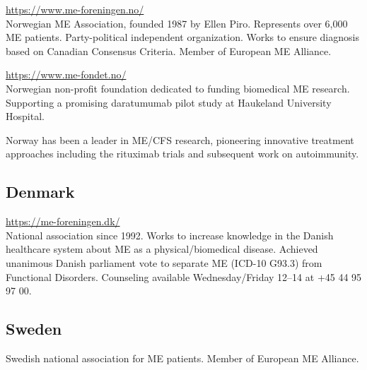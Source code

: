 \begin{description}[style=nextline]
\item[Norges ME Forening] \hfill \url{https://www.me-foreningen.no/}\\
Norwegian ME Association, founded 1987 by Ellen Piro. Represents over 6,000 ME patients. Party-political independent organization. Works to ensure diagnosis based on Canadian Consensus Criteria. Member of European ME Alliance.

\item[ME-Fondet] \hfill \url{https://www.me-fondet.no/}\\
Norwegian non-profit foundation dedicated to funding biomedical ME research. Supporting a promising daratumumab pilot study at Haukeland University Hospital.
\end{description}

\begin{remark}
Norway has been a leader in ME/CFS research, pioneering innovative treatment approaches including the rituximab trials and subsequent work on autoimmunity.
\end{remark}

\subsection{Denmark}
\label{subsec:denmark-orgs}

\begin{description}[style=nextline]
\item[ME Foreningen (Danish ME Association)] \hfill \url{https://me-foreningen.dk/}\\
National association since 1992. Works to increase knowledge in the Danish healthcare system about ME as a physical/biomedical disease. Achieved unanimous Danish parliament vote to separate ME (ICD-10 G93.3) from Functional Disorders. Counseling available Wednesday/Friday 12--14 at +45 44 95 97 00.
\end{description}

\subsection{Sweden}
\label{subsec:sweden-orgs}

\begin{description}[style=nextline]
\item[Riksföreningen för ME-patienter (RME)] \hfill Swedish national association for ME patients. Member of European ME Alliance.
\end{description}


